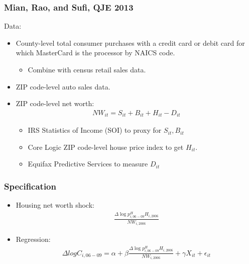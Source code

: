 \documentclass[english,xcolor=svgnames]{beamer}
\begin{document}
\begin{frame}
\frametitle[alignment=center]{Mian, Rao, and Sufi, QJE 2013}
Data:\\
\begin{itemize}
	\item County-level total consumer purchases with a credit card or debit card for which MasterCard is the processor by NAICS code. 
	\begin{itemize}
		\item Combine with census retail sales data.
	\end{itemize}
	\item ZIP code-level auto sales data.
	\item ZIP code-level net worth:
	\begin{align*}
		NW_{it} = S_{it} + B_{it} + H_{it} - D_{it}
	\end{align*}
	\begin{itemize}
		\item IRS Statistics of Income (SOI) to proxy for $S_{it}, B_{it}$
		\item Core Logic ZIP code-level house price index to get $H_{it}$.
		\item Equifax Predictive Services to measure $D_{it}$
	\end{itemize}
\end{itemize}
\end{frame}

\begin{frame}
\frametitle[alignment=center]{Specification}
\begin{itemize}
	\item Housing net worth shock:
	\begin{align*}
		\frac{\Delta \log p^H_{i,06-09}H_{i,2006}}{NW_{i,2006}}
	\end{align*}
	\item Regression:
	\begin{align*}
		\Delta log C_{i,06-09} = \alpha + \beta \frac{\Delta \log p^H_{i,06-09}H_{i,2006}}{NW_{i,2006}} + \gamma X_{it} + \epsilon_{it}
	\end{align*}
\end{itemize}
\end{frame}
\end{document}
